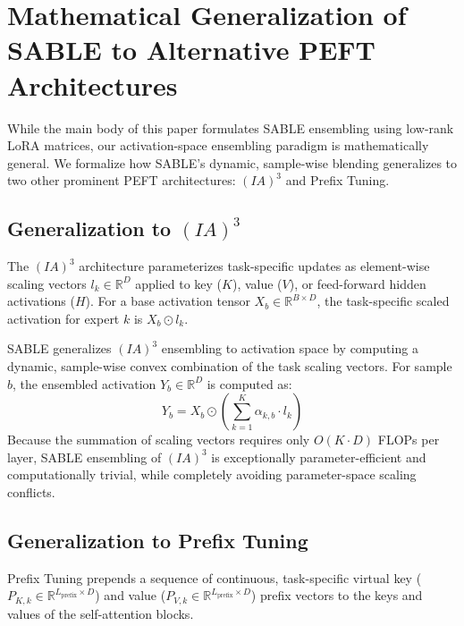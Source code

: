 \documentclass{article}
\theoremstyle{plain}
\theoremstyle{definition}
\theoremstyle{remark}
\begin{document}
\newpage
\section{Mathematical Generalization of SABLE to Alternative PEFT Architectures}
\label{app:peft_generalization}

While the main body of this paper formulates SABLE ensembling using low-rank LoRA matrices, our activation-space ensembling paradigm is mathematically general. We formalize how SABLE's dynamic, sample-wise blending generalizes to two other prominent PEFT architectures: $(IA)^3$ and Prefix Tuning.

\subsection{Generalization to $(IA)^3$}
The $(IA)^3$ architecture \cite{ia3} parameterizes task-specific updates as element-wise scaling vectors $l_{k} \in \mathbb{R}^D$ applied to key ($K$), value ($V$), or feed-forward hidden activations ($H$). For a base activation tensor $X_b \in \mathbb{R}^{B \times D}$, the task-specific scaled activation for expert $k$ is $X_b \odot l_{k}$.

SABLE generalizes $(IA)^3$ ensembling to activation space by computing a dynamic, sample-wise convex combination of the task scaling vectors. For sample $b$, the ensembled activation $Y_b \in \mathbb{R}^D$ is computed as:
\begin{equation}
Y_b = X_b \odot \left( \sum_{k=1}^K \alpha_{k, b} \cdot l_{k} \right)
\end{equation}
Because the summation of scaling vectors requires only $O(K \cdot D)$ FLOPs per layer, SABLE ensembling of $(IA)^3$ is exceptionally parameter-efficient and computationally trivial, while completely avoiding parameter-space scaling conflicts.

\subsection{Generalization to Prefix Tuning}
Prefix Tuning \cite{prefix} prepends a sequence of continuous, task-specific virtual key ($P_{K, k} \in \mathbb{R}^{L_{\text{prefix}} \times D}$) and value ($P_{V, k} \in \mathbb{R}^{L_{\text{prefix}} \times D}$) prefix vectors to the keys and values of the self-attention blocks. 
\end{document}
